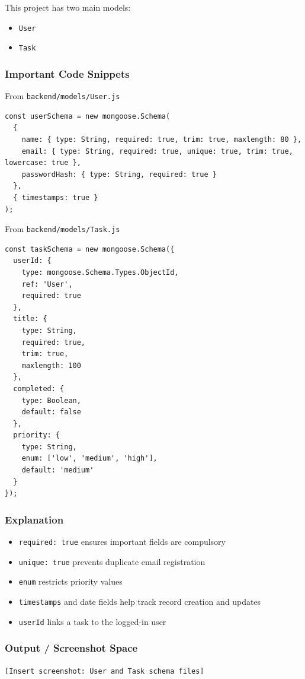 \documentclass[12pt,a4paper]{article}
\begin{document}
This project has two main models:
\begin{itemize}
  \item \texttt{User}
  \item \texttt{Task}
\end{itemize}

\subsubsection*{Important Code Snippets}
From \texttt{backend/models/User.js}
\begin{lstlisting}[style=projectcode]
const userSchema = new mongoose.Schema(
  {
    name: { type: String, required: true, trim: true, maxlength: 80 },
    email: { type: String, required: true, unique: true, trim: true, lowercase: true },
    passwordHash: { type: String, required: true }
  },
  { timestamps: true }
);
\end{lstlisting}

From \texttt{backend/models/Task.js}
\begin{lstlisting}[style=projectcode]
const taskSchema = new mongoose.Schema({
  userId: {
    type: mongoose.Schema.Types.ObjectId,
    ref: 'User',
    required: true
  },
  title: {
    type: String,
    required: true,
    trim: true,
    maxlength: 100
  },
  completed: {
    type: Boolean,
    default: false
  },
  priority: {
    type: String,
    enum: ['low', 'medium', 'high'],
    default: 'medium'
  }
});
\end{lstlisting}

\subsubsection*{Explanation}
\begin{itemize}
  \item \texttt{required: true} ensures important fields are compulsory
  \item \texttt{unique: true} prevents duplicate email registration
  \item \texttt{enum} restricts priority values
  \item \texttt{timestamps} and date fields help track record creation and updates
  \item \texttt{userId} links a task to the logged-in user
\end{itemize}

\subsubsection*{Output / Screenshot Space}
\texttt{[Insert screenshot: User and Task schema files]}
\end{document}
